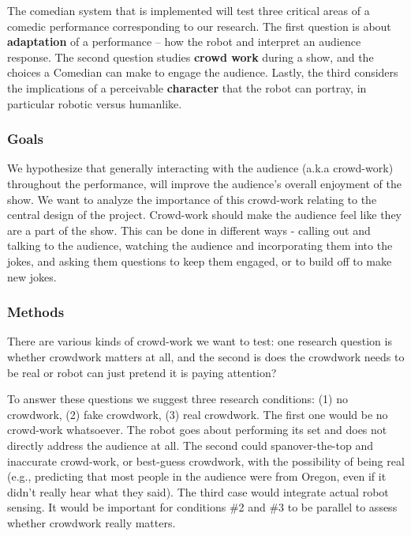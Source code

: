 \documentclass[onecolumn, draftclsnofoot,10pt, compsoc]{IEEEtran}
\begin{document}
The comedian system that is implemented will test three critical areas of a comedic performance corresponding to our research. The first question is about \textbf{adaptation} of a performance -- how the robot and interpret an audience response. The second question studies \textbf{crowd work} during a show, and the choices a Comedian can make to engage the audience. Lastly, the third considers the implications of a perceivable \textbf{character} that the robot can portray, in particular robotic versus humanlike.

\subsubsection{Goals}

We hypothesize that generally interacting with the audience (a.k.a crowd-work) throughout the performance, will improve the audience's overall enjoyment of the show. We want to analyze the importance of this crowd-work relating to the central design of the project.
Crowd-work should make the audience feel like they are a part of the show. This can be done in different ways - calling out and talking to the audience, watching the audience and incorporating them into the jokes, and asking them questions to keep them engaged, or to build off to make new jokes.

\subsubsection{Methods}
There are various kinds of crowd-work we want to test: one research question is whether crowdwork matters at all, and the second is does the crowdwork needs to be real or robot can just pretend it is paying attention?

To answer these questions we suggest three research conditions: (1) no crowdwork, (2) fake crowdwork, (3) real crowdwork. The first one would be no crowd-work whatsoever. The robot goes about performing its set and does not directly address the audience at all. The second could spanover-the-top and inaccurate crowd-work, or best-guess crowdwork, with the possibility of being real (e.g., predicting that most people in the audience were from Oregon, even if it didn't really hear what they said). The third case would integrate actual robot sensing. It would be important for conditions \#2 and \#3 to be parallel to assess whether crowdwork really matters.
\end{document}
